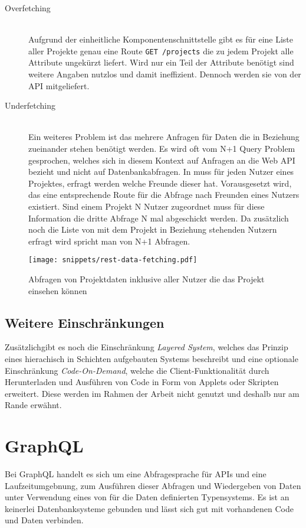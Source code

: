 \begin{description}
	\item[Overfetching\label{rest:overfetching}] \ \\
	Aufgrund der einheitliche Komponentenschnittstelle gibt es für eine Liste aller Projekte genau eine Route \lstinline|GET /projects| die zu jedem Projekt alle Attribute ungekürzt liefert. Wird nur ein Teil der Attribute benötigt sind weitere Angaben nutzlos und damit ineffizient.
	Dennoch werden sie von der API mitgeliefert.
	\item[Underfetching\label{rest:underfetching}] \ \\
	Ein weiteres Problem ist das mehrere Anfragen für Daten die in Beziehung zueinander stehen benötigt werden. Es wird oft vom N+1 Query Problem gesprochen, welches sich in diesem Kontext auf Anfragen an die Web API bezieht und nicht auf Datenbankabfragen.
	In  muss für jeden Nutzer eines Projektes, erfragt werden welche Freunde dieser hat. Vorausgesetzt wird, das eine entsprechende Route für die Abfrage nach Freunden eines Nutzers existiert.
	Sind einem Projekt N Nutzer zugeordnet muss für diese Information die dritte Abfrage N mal abgeschickt werden. Da zusätzlich noch die Liste von mit dem Projekt in Beziehung stehenden Nutzern erfragt wird spricht man von N+1 Abfragen.
\end{description}

\begin{figure}[h!]
	\centering
	\texttt{[image: snippets/rest-data-fetching.pdf]}
	\caption{Abfragen von Projektdaten inklusive aller Nutzer die das Projekt einsehen können}
	\label{basics:rest:data-fetching}
\end{figure}

\subsection{Weitere Einschränkungen}
Zusätzlichgibt es noch die Einschränkung \emph{Layered System}, welches das Prinzip eines hierachisch in Schichten aufgebauten Systems
beschreibt und eine optionale Einschränkung \emph{Code-On-Demand}, welche die Client-Funktionalität durch Herunterladen und Ausführen von Code in
Form von Applets oder Skripten erweitert. Diese werden im Rahmen der Arbeit nicht genutzt und deshalb nur am Rande erwähnt.

\section{GraphQL}
\label{sec:basics:graphql}
Bei GraphQL handelt es sich um eine Abfragesprache für APIs und eine Laufzeitumgebnung,
zum Ausführen dieser Abfragen und Wiedergeben von Daten unter Verwendung eines von für die Daten definierten Typensystems.
Es ist an keinerlei Datenbanksysteme gebunden und lässt sich gut mit vorhandenen Code und Daten verbinden.

